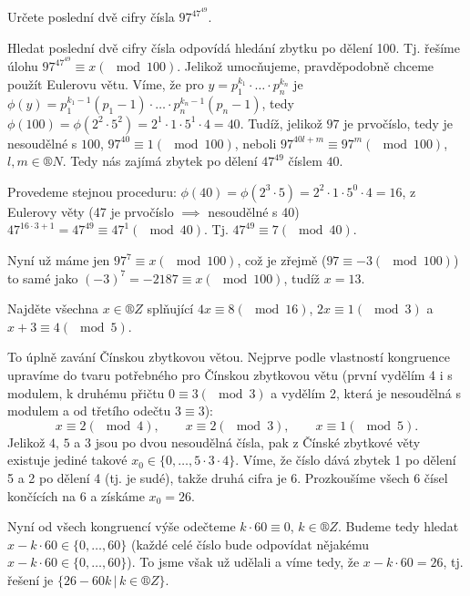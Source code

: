 \documentclass[12pt]{article}                   %
\let\oldmod=\mod
\def\mod{\!\!\!\!\oldmod}
\begin{document}
    \begin{priklad}[2.3]
        Určete poslední dvě cifry čísla $97^{47^{49}}$.

        \begin{reseni}
            Hledat poslední dvě cifry čísla odpovídá hledání zbytku po dělení 100. Tj. řešíme úlohu $97^{47^{49}} ≡ x (\mod 100)$. Jelikož umocňujeme, pravděpodobně chceme použít Eulerovu větu. Víme, že pro $y = p_1^{k_1}·…·p_n^{k_n}$ je $\phi(y) = p_1^{k_1 - 1}(p_1 - 1)·…·p_n^{k_n - 1}(p_n - 1)$, tedy $\phi(100) = \phi(2^2·5^2) = 2^1·1·5^1·4 = 40$. Tudíž, jelikož $97$ je prvočíslo, tedy je nesoudělné s $100$, $97^{40} ≡ 1 (\mod 100)$, neboli $97^{40l + m} ≡ 97^{m} (\mod 100)$, $l, m \in ®N$. Tedy nás zajímá zbytek po dělení $47^{49}$ číslem $40$.

            Provedeme stejnou proceduru: $\phi(40) = \phi(2^3·5) = 2^2·1·5^0·4 = 16$, z Eulerovy věty (47 je prvočíslo $\implies$ nesoudělné s 40) $47^{16·3 + 1} = 47^{49} ≡ 47^1 (\mod 40)$. Tj. $47^{49} ≡ 7 (\mod 40)$.

            Nyní už máme jen $97^7 ≡ x (\mod 100)$, což je zřejmě ($97 ≡ -3 (\mod 100)$) to samé jako $(-3)^7 = -2187 ≡ x (\mod 100)$, tudíž $x = 13$.
        \end{reseni}
    \end{priklad}

    \begin{priklad}[2.4]
        Najděte všechna $x\in ®Z$ splňující $ 4x ≡ 8 (\mod 16)$, $2x ≡ 1 (\mod 3)$ a $x + 3 ≡ 4 (\mod 5)$.

        \begin{reseni}
            To úplně zavání Čínskou zbytkovou větou. Nejprve podle vlastností kongruence upravíme do tvaru potřebného pro Čínskou zbytkovou větu (první vydělím 4 i s modulem, k druhému přičtu $0≡3 (\mod 3)$ a vydělím 2, která je nesoudělná s modulem a od třetího odečtu $3 ≡ 3$):
            $$ x ≡ 2 (\mod 4), \qquad x ≡ 2 (\mod 3), \qquad x ≡ 1 (\mod 5). $$
            Jelikož $4$, $5$ a $3$ jsou po dvou nesoudělná čísla, pak z Čínské zbytkové věty existuje jediné takové $x_0 \in \{0, …, 5·3·4\}$. Víme, že číslo dává zbytek 1 po dělení 5 a 2 po dělení 4 (tj. je sudé), takže druhá cifra je 6. Prozkoušíme všech 6 čísel končících na 6 a získáme $x_0 = 26$.
            
            Nyní od všech kongruencí výše odečteme $k·60≡0$, $k \in ®Z$. Budeme tedy hledat $x - k·60 \in \{0, …, 60\}$ (každé celé číslo bude odpovídat nějakému $x - k·60 \in \{0, …, 60\}$). To jsme však už udělali a víme tedy, že $x - k·60 = 26$, tj. řešení je $\{26 - 60k\,|\,k \in ®Z\}$.
        \end{reseni}
    \end{priklad}
\end{document}
